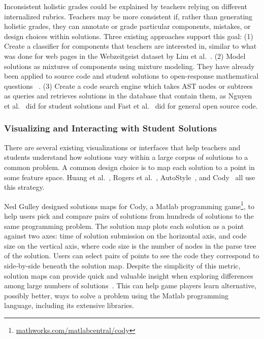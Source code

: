 
Inconsistent holistic grades could be explained by teachers relying on different internalized rubrics. Teachers may be more consistent if, rather than generating holistic grades, they can annotate or grade particular components, mistakes, or design choices within solutions. Three existing approaches support this goal: (1) Create a classifier for components that teachers are interested in, similar to what was done for web pages in the Webzeitgeist dataset by Lim et al.~\cite{lim2012learning}. (2) Model solutions as mixtures of components using mixture modeling. They have already been applied to source code and student solutions to open-response mathematical questions ~\cite{binkley2014understanding,Linstead}. (3) Create a code search engine which takes AST nodes or subtrees as queries and retrieves solutions in the database that contain them, as Nguyen et al.~\cite{codewebs} did for student solutions and Fast et al.~\cite{codex} did for general open source code.



\subsubsection{Visualizing and Interacting with Student Solutions}

There are several existing visualizations or interfaces that help teachers and students understand how solutions vary within a large corpus of solutions to a common problem. A common design choice is to map each solution to a point in some feature space. Huang et al.~\cite{MOOCshop}, Rogers et al.~\cite{ACESthesis}, AutoStyle~\cite{choudhury2016autostyle}, and Cody~\cite{ICERGlassman} all use this strategy. %


Ned Gulley designed solutions maps for Cody, a Matlab programming game\footnote{\url{mathworks.com/matlabcentral/cody}}, to help users pick and compare pairs of solutions from hundreds of solutions to the same programming problem. The solution map plots each solution as a point against two axes: time of solution submission on the horizontal axis, and code size on the vertical axis, where code size is the number of nodes in the parse tree of the solution. Users can select pairs of points to see the code they correspond to side-by-side beneath the solution map. Despite the simplicity of this metric, solution maps can provide quick and valuable insight when exploring differences among large numbers of solutions~\cite{ICERGlassman}. This can help game players learn alternative, possibly better, ways to solve a problem using the Matlab programming language, including its extensive libraries.

